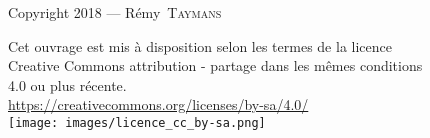 \begin{center}
    \footnotesize

    \mbox{}

    \vfill

    Copyright 2018 --- Rémy~\textsc{Taymans}

    Cet ouvrage est mis à disposition selon les termes de la licence\\
    Creative Commons attribution - partage dans les mêmes conditions\\
    4.0 ou plus récente.\\
    \url{https://creativecommons.org/licenses/by-sa/4.0/}\\
    \vspace{\baselineskip}
    \texttt{[image: images/licence\_cc\_by-sa.png]}

    \normalsize
\end{center}
